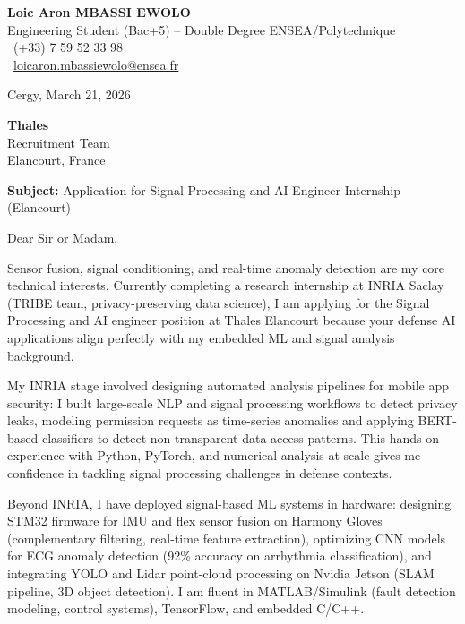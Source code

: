 \documentclass[a4paper,11pt]{article}
\begin{document}
\noindent
\begin{minipage}[t]{0.5\textwidth}
    \textbf{Loic Aron MBASSI EWOLO}\\
    Engineering Student (Bac+5) -- Double Degree ENSEA/Polytechnique\\[3pt]
    \Mobilefone\ (+33) 7 59 52 33 98\\
    \Letter\ \href{mailto:loicaron.mbassiewolo@ensea.fr}{loicaron.mbassiewolo@ensea.fr}
\end{minipage}
\hfill
\begin{minipage}[t]{0.4\textwidth}
    \raggedleft
    Cergy, March 21, 2026
\end{minipage}

\vspace{1.2cm}

\hfill
\begin{minipage}[t]{0.5\textwidth}
    \raggedleft
    \textbf{Thales} \\
    Recruitment Team \\
    Elancourt, France
\end{minipage}

\vspace{1cm}

\noindent\textbf{Subject:} Application for Signal Processing and AI Engineer Internship (Elancourt)

\vspace{0.8cm}

Dear Sir or Madam,

Sensor fusion, signal conditioning, and real-time anomaly detection are my core technical interests. Currently completing a research internship at INRIA Saclay (TRIBE team, privacy-preserving data science), I am applying for the Signal Processing and AI engineer position at Thales Elancourt because your defense AI applications align perfectly with my embedded ML and signal analysis background.

My INRIA stage involved designing automated analysis pipelines for mobile app security: I built large-scale NLP and signal processing workflows to detect privacy leaks, modeling permission requests as time-series anomalies and applying BERT-based classifiers to detect non-transparent data access patterns. This hands-on experience with Python, PyTorch, and numerical analysis at scale gives me confidence in tackling signal processing challenges in defense contexts.

Beyond INRIA, I have deployed signal-based ML systems in hardware: designing STM32 firmware for IMU and flex sensor fusion on Harmony Gloves (complementary filtering, real-time feature extraction), optimizing CNN models for ECG anomaly detection (92\% accuracy on arrhythmia classification), and integrating YOLO and Lidar point-cloud processing on Nvidia Jetson (SLAM pipeline, 3D object detection). I am fluent in MATLAB/Simulink (fault detection modeling, control systems), TensorFlow, and embedded C/C++.
\end{document}
